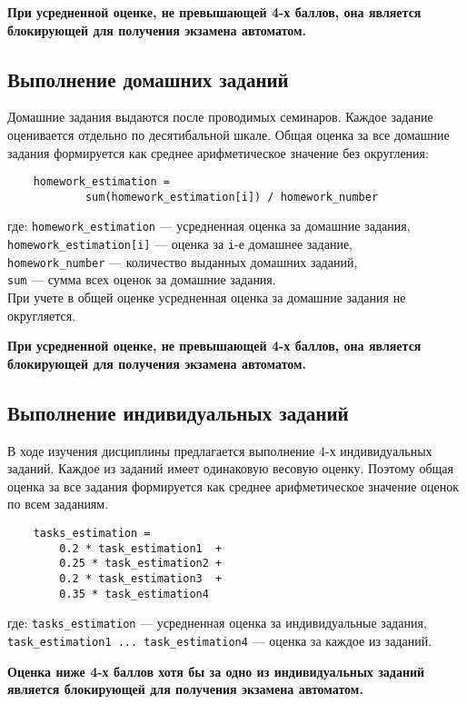 \documentclass[a4paper, 12pt, oneside]{article}
\begin{document}
\textbf{При усредненной оценке, не превышающей 4-х баллов, она является блокирующей для получения экзамена автоматом.}

\subsection{Выполнение домашних заданий}
Домашние задания выдаются после проводимых семинаров. Каждое задание оценивается отдельно по десятибальной шкале. Общая оценка за все домашние задания формируется как среднее арифметическое значение без округления:

\begin{verbatim}
    homework_estimation =
            sum(homework_estimation[i]) / homework_number
\end{verbatim}
где: \verb|homework_estimation| --- усредненная оценка за домашние задания,\\ \verb|homework_estimation[i]| --- оценка за \verb|i|-е домашнее задание,\\ \verb|homework_number| --- количество выданных домашних заданий,\\
\verb|sum| --- сумма всех оценок за домашние задания.\\
При учете в общей оценке усредненная оценка за домашние задания не округляется.

\textbf{При усредненной оценке, не превышающей 4-х баллов, она является блокирующей для получения экзамена автоматом.}

\subsection{Выполнение индивидуальных заданий}

В ходе изучения дисциплины предлагается выполнение 4-х индивидуальных заданий.
Каждое из заданий имеет одинаковую весовую оценку. Поэтому общая оценка за все задания формируется как среднее арифметическое значение оценок по всем заданиям.

\begin{verbatim}
    tasks_estimation =
        0.2 * task_estimation1  +
        0.25 * task_estimation2 +
        0.2 * task_estimation3  +
        0.35 * task_estimation4
\end{verbatim}
где:  \verb|tasks_estimation| --- усредненная оценка за индивидуальные задания, \\
\verb|task_estimation1 ... task_estimation4| --- оценка за каждое из заданий.

\textbf{Оценка ниже 4-х баллов хотя бы за одно из индивидуальных заданий является блокирующей для получения экзамена автоматом.}
\end{document}

